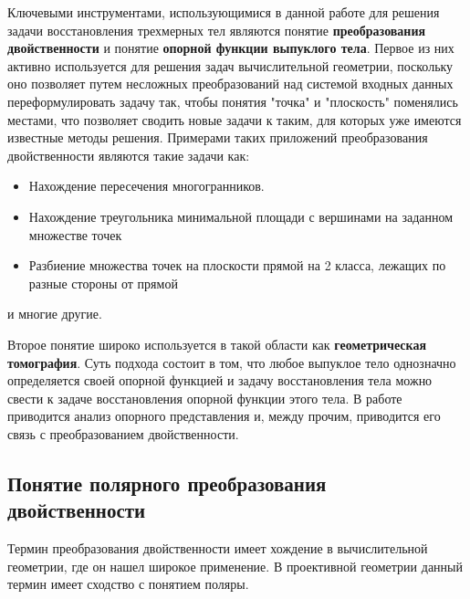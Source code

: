 \documentclass[a4paper, 12pt, titlepage]{article}
\theoremstyle{definition}
\theoremstyle{plain}
\theoremstyle{plain}
\begin{document}
Ключевыми инструментами, использующимися в данной работе для решения задачи
восстановления трехмерных тел являются понятие \textbf{преобразования
двойственности} и понятие \textbf{опорной функции выпуклого тела}. Первое из
них активно используется для решения задач вычислительной геометрии, поскольку
оно позволяет путем несложных преобразований над системой входных данных
переформулировать задачу так, чтобы понятия "точка" и "плоскость" поменялись
местами, что позволяет сводить новые задачи к таким, для которых уже имеются
известные методы решения. Примерами таких приложений преобразования
двойственности являются такие задачи как:

\begin{itemize}
 \item Нахождение пересечения многогранников.
 \item Нахождение треугольника минимальной площади с вершинами на заданном
множестве точек \cite{journals/BIT/ChazelleG1985}
 \item Разбиение множества точек на плоскости прямой на 2 класса, лежащих по
 разные стороны от прямой
\end{itemize}

и многие другие.

Второе понятие широко используется в такой области как \textbf{геометрическая
томография}. Суть подхода состоит в том, что любое выпуклое тело однозначно
определяется своей опорной функцией и задачу восстановления тела можно свести к
задаче восстановления опорной функции этого тела. В работе
\cite{journals/cviu/GhoshK98} приводится анализ опорного представления и, между 
прочим, приводится его связь с преобразованием двойственности.

\subsection{Понятие полярного преобразования двойственности}

Термин преобразования двойственности имеет хождение в вычислительной геометрии,
где он нашел широкое применение. В проективной геометрии данный термин имеет
сходство с понятием поляры.
\end{document}
